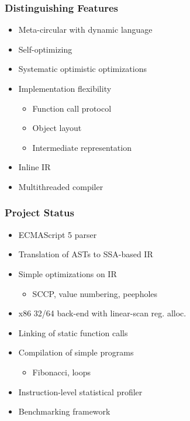 \begin{frame}
\frametitle{\bf Distinguishing Features}
    \begin{itemize}
        \item Meta-circular with dynamic language
        \item Self-optimizing
        \item Systematic optimistic optimizations
        \item Implementation flexibility
        \begin{itemize}
            \item Function call protocol
            \item Object layout
            \item Intermediate representation
        \end{itemize}
        \item Inline IR
        \item Multithreaded compiler
    \end{itemize}
\end{frame}

\begin{frame}
\frametitle{\bf Project Status}
    \begin{itemize}
        \item ECMAScript 5 parser
        \item Translation of ASTs to SSA-based IR
        \item Simple optimizations on IR
        \begin{itemize}
            \item SCCP, value numbering, peepholes
        \end{itemize}
        \item x86 32/64 back-end with linear-scan reg. alloc.
        \item Linking of static function calls
        \item Compilation of simple programs
        \begin{itemize}
            \item Fibonacci, loops
        \end{itemize}
        \item Instruction-level statistical profiler
        \item Benchmarking framework
    \end{itemize}
\end{frame}

